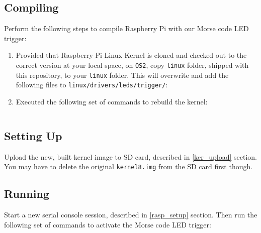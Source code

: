 \documentclass[onecolumn, draftclsnofoot, 10pt, compsoc]{IEEEtran}
\begin{document}
\subsection{Compiling}
Perform the following steps to compile Raspberry Pi with our Morse code LED trigger:
\begin{enumerate}
\item Provided that Raspberry Pi Linux Kernel is cloned and checked out to the correct version at your local space, on \texttt{OS2}, copy \texttt{linux} folder, shipped with this repository, to your \texttt{linux} folder. This will overwrite and add the following files to \texttt{linux/drivers/leds/trigger/}:
\item Executed the following set of commands to rebuild the kernel:
\inputminted[breaklines]{bash}{cs4.sh}
\end{enumerate}

\subsection{Setting Up}
Upload the new, built kernel image to SD card, described in \ref{ker_upload} section. You may have to delete the original \texttt{kernel8.img} from the SD card first though.

\subsection{Running}
Start a new serial console session, described in \ref{rasp_setup} section. Then run the following set of commands to activate the Morse code LED trigger:
\inputminted[breaklines]{bash}{cs5.sh}


\clearpage
\medskip


\end{document}
